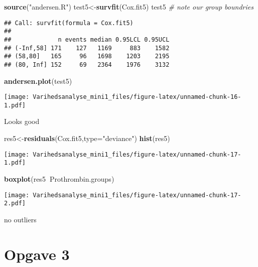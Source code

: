 \documentclass[
]{article}
\newenvironment{Shaded}{\begin{snugshade}}{\end{snugshade}}
\newcommand{\CommentTok}[1]{\textcolor[rgb]{0.56,0.35,0.01}{\textit{#1}}}
\newcommand{\DataTypeTok}[1]{\textcolor[rgb]{0.13,0.29,0.53}{#1}}
\newcommand{\KeywordTok}[1]{\textcolor[rgb]{0.13,0.29,0.53}{\textbf{#1}}}
\newcommand{\NormalTok}[1]{#1}
\newcommand{\OperatorTok}[1]{\textcolor[rgb]{0.81,0.36,0.00}{\textbf{#1}}}
\newcommand{\StringTok}[1]{\textcolor[rgb]{0.31,0.60,0.02}{#1}}
\begin{document}
\begin{Shaded}
\begin{Highlighting}[]
\KeywordTok{source}\NormalTok{(}\StringTok{"andersen.R"}\NormalTok{)}
\NormalTok{test5<-}\KeywordTok{survfit}\NormalTok{(Cox.fit5)}
\NormalTok{test5 }\CommentTok{# note our group boundries}
\end{Highlighting}
\end{Shaded}

\begin{verbatim}
## Call: survfit(formula = Cox.fit5)
## 
##             n events median 0.95LCL 0.95UCL
## (-Inf,58] 171    127   1169     883    1582
## (58,80]   165     96   1698    1203    2195
## (80, Inf] 152     69   2364    1976    3132
\end{verbatim}

\begin{Shaded}
\begin{Highlighting}[]
\KeywordTok{andersen.plot}\NormalTok{(test5)}
\end{Highlighting}
\end{Shaded}

\texttt{[image: Varihedsanalyse\_mini1\_files/figure-latex/unnamed-chunk-16-1.pdf]}

Looks good

\begin{Shaded}
\begin{Highlighting}[]
\NormalTok{res5<-}\KeywordTok{residuals}\NormalTok{(Cox.fit5,}\DataTypeTok{type=}\StringTok{"deviance"}\NormalTok{)}
\KeywordTok{hist}\NormalTok{(res5)}
\end{Highlighting}
\end{Shaded}

\texttt{[image: Varihedsanalyse\_mini1\_files/figure-latex/unnamed-chunk-17-1.pdf]}

\begin{Shaded}
\begin{Highlighting}[]
\KeywordTok{boxplot}\NormalTok{(res5}\OperatorTok{~}\NormalTok{Prothrombin.groups)}
\end{Highlighting}
\end{Shaded}

\texttt{[image: Varihedsanalyse\_mini1\_files/figure-latex/unnamed-chunk-17-2.pdf]}

no outliers

\hypertarget{opgave-3}{%
\section{Opgave 3}\label{opgave-3}}
\end{document}
